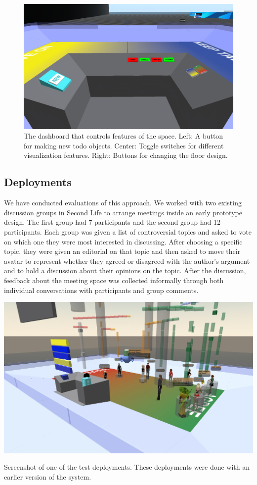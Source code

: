 \begin{figure}[tp]
	\includegraphics{figures/dashboard.png}
	\caption{The dashboard that controls features of the space. Left: A button for making new todo objects. Center: Toggle switches for different visualization features. Right: Buttons for changing the floor design.}
	\label{fig:information_space_dashboard}
\end{figure}


\subsection{Deployments}
We have conducted evaluations of this approach. We worked with two existing discussion groups in Second Life to arrange meetings inside an early prototype design. The first group had 7 participants and the second group had 12 participants. Each group was given a list of controversial topics and asked to vote on which one they were most interested in discussing. After choosing a specific topic, they were given an editorial on that topic and then asked to move their avatar to represent whether they agreed or disagreed with the author's argument and to hold a discussion about their opinions on the topic. After the discussion, feedback about the meeting space was collected informally through both individual conversations with participants and group comments.

\begin{marginfigure}
	\includegraphics{figures/meeting_space_trial_1.jpg}
	\caption{Screenshot of one of the test deployments. These deployments were done with an earlier version of the system.}
	\label{fig:meeting_space_trial_1}
\end{marginfigure}

